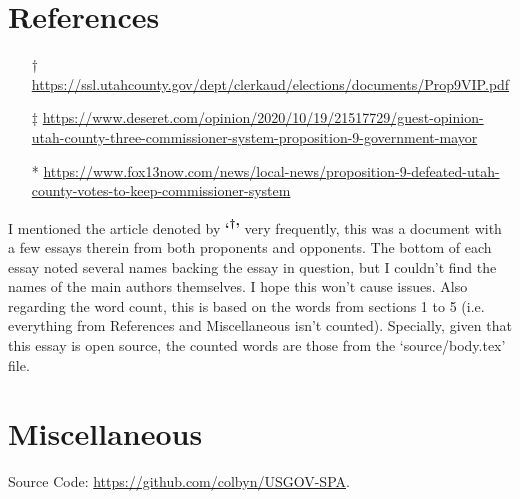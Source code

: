 

\section*{References}

\begin{itemize}
    \item[†] \url{https://ssl.utahcounty.gov/dept/clerkaud/elections/documents/Prop9VIP.pdf}
    \item[‡] \url{https://www.deseret.com/opinion/2020/10/19/21517729/guest-opinion-utah-county-three-commissioner-system-proposition-9-government-mayor}
    \item[*] \url{https://www.fox13now.com/news/local-news/proposition-9-defeated-utah-county-votes-to-keep-commissioner-system}
\end{itemize}

I mentioned the article denoted by \textbf{`\textsuperscript{†}'} very frequently, this was a document with a few essays therein from both proponents and opponents. The bottom of each essay noted several names backing the essay in question, but I couldn't find the names of the main authors themselves. I hope this won't cause issues. Also regarding the word count, this is based on the words from sections 1 to 5 (i.e. everything from References and Miscellaneous isn't counted). Specially, given that this essay is open source, the counted words are those from the `source/body.tex' file.


\section*{Miscellaneous}
\begin{center}
    Source Code: \url{https://github.com/colbyn/USGOV-SPA}.
\end{center}
